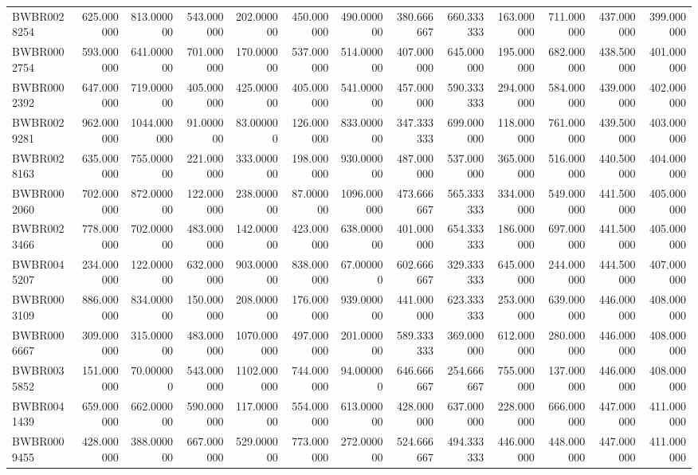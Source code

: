 \begin{longtable}{lrrrrrrrrrrrr}
BWBR0028254 & 625.000000 & 813.000000 & 543.000000 & 202.000000 & 450.000000 & 490.000000 & 380.666667 & 660.333333 & 163.000000 & 711.000000 & 437.000000 & 399.000000 \\
BWBR0002754 & 593.000000 & 641.000000 & 701.000000 & 170.000000 & 537.000000 & 514.000000 & 407.000000 & 645.000000 & 195.000000 & 682.000000 & 438.500000 & 401.000000 \\
BWBR0002392 & 647.000000 & 719.000000 & 405.000000 & 425.000000 & 405.000000 & 541.000000 & 457.000000 & 590.333333 & 294.000000 & 584.000000 & 439.000000 & 402.000000 \\
BWBR0029281 & 962.000000 & 1044.000000 & 91.000000 & 83.000000 & 126.000000 & 833.000000 & 347.333333 & 699.000000 & 118.000000 & 761.000000 & 439.500000 & 403.000000 \\
BWBR0028163 & 635.000000 & 755.000000 & 221.000000 & 333.000000 & 198.000000 & 930.000000 & 487.000000 & 537.000000 & 365.000000 & 516.000000 & 440.500000 & 404.000000 \\
BWBR0002060 & 702.000000 & 872.000000 & 122.000000 & 238.000000 & 87.000000 & 1096.000000 & 473.666667 & 565.333333 & 334.000000 & 549.000000 & 441.500000 & 405.000000 \\
BWBR0023466 & 778.000000 & 702.000000 & 483.000000 & 142.000000 & 423.000000 & 638.000000 & 401.000000 & 654.333333 & 186.000000 & 697.000000 & 441.500000 & 405.000000 \\
BWBR0045207 & 234.000000 & 122.000000 & 632.000000 & 903.000000 & 838.000000 & 67.000000 & 602.666667 & 329.333333 & 645.000000 & 244.000000 & 444.500000 & 407.000000 \\
BWBR0003109 & 886.000000 & 834.000000 & 150.000000 & 208.000000 & 176.000000 & 939.000000 & 441.000000 & 623.333333 & 253.000000 & 639.000000 & 446.000000 & 408.000000 \\
BWBR0006667 & 309.000000 & 315.000000 & 483.000000 & 1070.000000 & 497.000000 & 201.000000 & 589.333333 & 369.000000 & 612.000000 & 280.000000 & 446.000000 & 408.000000 \\
BWBR0035852 & 151.000000 & 70.000000 & 543.000000 & 1102.000000 & 744.000000 & 94.000000 & 646.666667 & 254.666667 & 755.000000 & 137.000000 & 446.000000 & 408.000000 \\
BWBR0041439 & 659.000000 & 662.000000 & 590.000000 & 117.000000 & 554.000000 & 613.000000 & 428.000000 & 637.000000 & 228.000000 & 666.000000 & 447.000000 & 411.000000 \\
BWBR0009455 & 428.000000 & 388.000000 & 667.000000 & 529.000000 & 773.000000 & 272.000000 & 524.666667 & 494.333333 & 446.000000 & 448.000000 & 447.000000 & 411.000000 \\

\end{longtable}
